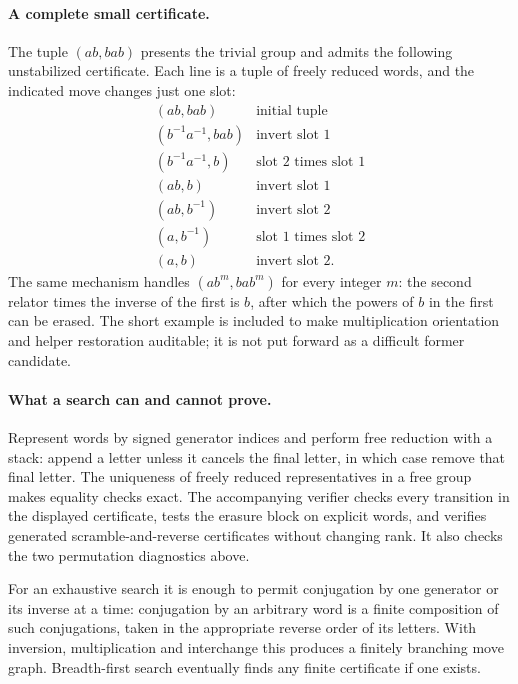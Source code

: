 \documentclass[11pt]{article}
\begin{document}
\paragraph{A complete small certificate.}
The tuple $(ab,bab)$ presents the trivial group and admits the
following unstabilized certificate. Each line is a tuple of freely
reduced words, and the indicated move changes just one slot:
\[
\begin{array}{c|l}
 (ab,bab)&\text{initial tuple}\\
 (b^{-1}a^{-1},bab)&\text{invert slot 1}\\
 (b^{-1}a^{-1},b)&\text{slot 2 times slot 1}\\
 (ab,b)&\text{invert slot 1}\\
 (ab,b^{-1})&\text{invert slot 2}\\
 (a,b^{-1})&\text{slot 1 times slot 2}\\
 (a,b)&\text{invert slot 2}.
\end{array}
\]
The same mechanism handles $(ab^m,bab^m)$ for every integer $m$:
the second relator times the inverse of the first is $b$, after which
the powers of $b$ in the first can be erased. The short example is
included to make multiplication orientation and helper restoration
auditable; it is not put forward as a difficult former candidate.

\paragraph{What a search can and cannot prove.}
Represent words by signed generator indices and perform free reduction
with a stack: append a letter unless it cancels the final letter,
in which case remove that final letter. The uniqueness of freely
reduced representatives in a free group makes equality checks exact.
The accompanying verifier checks every transition in the displayed
certificate, tests the erasure block on explicit words, and verifies
generated scramble-and-reverse certificates without changing rank.
It also checks the two permutation diagnostics above.

For an exhaustive search it is enough to permit conjugation by one
generator or its inverse at a time: conjugation by an arbitrary word
is a finite composition of such conjugations, taken in the appropriate
reverse order of its letters. With inversion, multiplication and
interchange this produces a finitely branching move graph. Breadth-first
search eventually finds any finite certificate if one exists.
\end{document}

